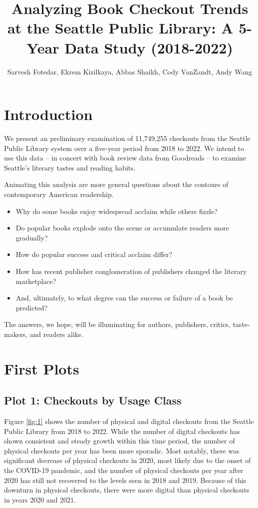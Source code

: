 \documentclass[10pt]{article}\usepackage[]{graphicx}\usepackage[]{xcolor}
\begin{document}
\title{Analyzing Book Checkout Trends at the Seattle Public Library: A 5-Year Data Study (2018-2022)}
\author{Sarvesh Fotedar, Ekrem Kizilkaya, Abbas Shaikh, Cody VanZandt, Andy Wang}
\maketitle
\tableofcontents

\newpage

\section{Introduction}

We present an preliminary examination of 11,749,255 checkouts from the Seattle Public Library system over a five-year period from 2018 to 2022. We intend to use this data -- in concert with book review data from Goodreads -- to examine Seattle's literary tastes and reading habits.

Animating this analysis are more general questions about the contours of contemporary American readership.

\begin{itemize}
  \item Why do some books enjoy widespread acclaim while others fizzle?
  \item Do popular books explode onto the scene or accumulate readers more gradually?
  \item How do popular success and critical acclaim differ?
  \item How has recent publisher conglomeration of publishers changed the literary marketplace? 
  \item And, ultimately, to what degree can the success or failure of a book be predicted?
\end{itemize}

The answers, we hope, will be illuminating for authors, publishers, critics, taste-makers, and readers alike. 

\section{First Plots}

\subsection{Plot 1: Checkouts by Usage Class}

Figure \ref{fig:1} shows the number of physical and digital checkouts from the Seattle Public Library from 2018 to 2022. While the number of digital checkouts has shown consistent and steady growth within this time period, the number of physical checkouts per year has been more sporadic. Most notably, there was significant decrease of physical checkouts in 2020, most likely due to the onset of the COVID-19 pandemic, and the number of physical checkouts per year after 2020 has still not recovered to the levels seen in 2018 and 2019. Because of this downturn in physical checkouts, there were more digital than physical checkouts in years 2020 and 2021.
\end{document}
